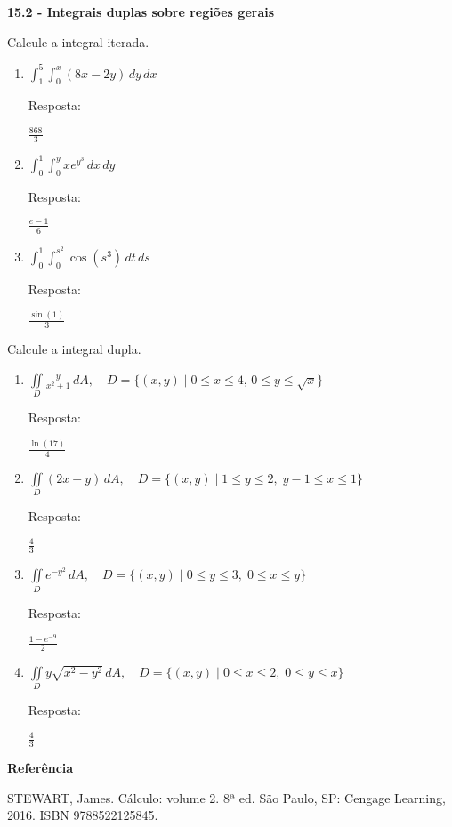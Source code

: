 \documentclass[a4paper, 12pt]{article}
\newcommand{\resposta}[1]{\hfill{{\begin{scriptsize} Resposta: \end{scriptsize}} #1}}
\begin{document}
	\thispagestyle{empty}

	\begin{large} 
	\begin{center}		
		\textbf{15.2 - Integrais duplas sobre regiões gerais}		
	\end{center}
	\end{large} 
	
	\vspace{5mm}
	
	Calcule a integral iterada.
	
	\begin{enumerate} %
		
		\item $\displaystyle \int_{1}^{5} \int_{0}^{x} (8x - 2y) \, dy \, dx$ 
		\resposta{$\frac{868}{3}$}
		
		\item $\displaystyle \int_{0}^{1} \int_{0}^{y} xe^{y^{3}} \, dx \, dy$ 
		\resposta{$\frac{e-1}{6}$}
		
		\item $\displaystyle \int_{0}^{1} \int_{0}^{s^{2}} \cos(s^{3}) \, dt \, ds$ 
		\resposta{$\frac{\sin(1)}{3}$}
		
		
	\end{enumerate}
	
	\vspace{5mm}
	
	Calcule a integral dupla.
	
	\begin{enumerate}[resume]
	
		\item $\displaystyle \iint \limits_{D} \frac{y}{x^2 + 1} \, dA, \quad D = \{ (x, y) \; | \; 0 \leq x \leq 4, \, 0 \leq y \leq \sqrt{x} \}$
		\resposta{$\frac{\ln(17)}{4}$}
		
		\item $\displaystyle \iint \limits_{D} (2x + y) \, dA, \quad D = \{ (x, y) \; | \; 1 \leq y \leq 2, \; y-1 \leq x \leq 1 \}$
		\resposta{$\frac{4}{3}$}
		
		\item $\displaystyle \iint \limits_{D} e^{-y^2} \, dA, \quad D = \{ (x, y) \; | \; 0 \leq y \leq 3, \; 0 \leq x \leq y \}$
		\resposta{$\frac{1-e^{-9}}{2}$}
		
		\item $\displaystyle \iint \limits_{D} y \sqrt{x^2 - y^2} \, dA, \quad D = \{ (x, y) \; | \; 0 \leq x \leq 2, \; 0 \leq y \leq x \}$
		\resposta{$\frac{4}{3}$}
	
	\end{enumerate}
			
	\vspace{5mm}	
	
	\textbf{Referência}	
	
	\begin{footnotesize}
		STEWART, James. Cálculo: volume 2. 8ª ed. São Paulo, SP: Cengage Learning, 2016. ISBN 9788522125845.
	\end{footnotesize}
\end{document}

